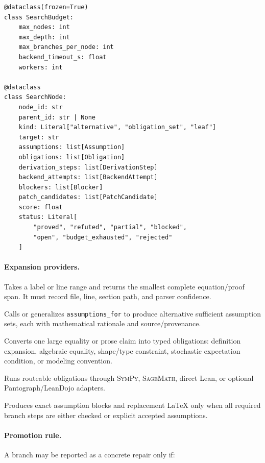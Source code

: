 \documentclass[11pt]{article}
\newcommand{\Sage}{\textsc{SageMath}}
\newcommand{\SymPy}{\textsc{SymPy}}
\begin{document}
\begin{verbatim}
@dataclass(frozen=True)
class SearchBudget:
    max_nodes: int
    max_depth: int
    max_branches_per_node: int
    backend_timeout_s: float
    workers: int

@dataclass
class SearchNode:
    node_id: str
    parent_id: str | None
    kind: Literal["alternative", "obligation_set", "leaf"]
    target: str
    assumptions: list[Assumption]
    obligations: list[Obligation]
    derivation_steps: list[DerivationStep]
    backend_attempts: list[BackendAttempt]
    blockers: list[Blocker]
    patch_candidates: list[PatchCandidate]
    score: float
    status: Literal[
        "proved", "refuted", "partial", "blocked",
        "open", "budget_exhausted", "rejected"
    ]
\end{verbatim}

\paragraph{Expansion providers.}

\begin{description}[leftmargin=*]
\item[Source span provider.] Takes a label or line range and returns the
  smallest complete equation/proof span. It must record file, line, section
  path, and parser confidence.
\item[Assumption provider.] Calls or generalizes \texttt{assumptions\_for} to
  produce alternative sufficient assumption sets, each with mathematical
  rationale and source/provenance.
\item[Derivation split provider.] Converts one large equality or prose claim
  into typed obligations: definition expansion, algebraic equality, shape/type
  constraint, stochastic expectation condition, or modeling convention.
\item[Backend provider.] Runs routeable obligations through \SymPy{}, \Sage{},
  direct Lean, or optional Pantograph/LeanDojo adapters.
\item[Patch provider.] Produces exact assumption blocks and replacement LaTeX
  only when all required branch steps are either checked or explicit accepted
  assumptions.
\end{description}

\paragraph{Promotion rule.}
A branch may be reported as a concrete repair only if:
\end{document}
